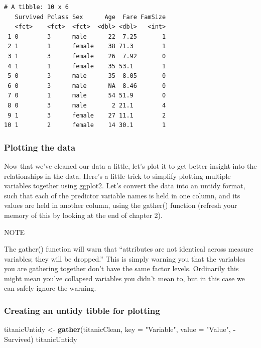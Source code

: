 \documentclass[
]{article}
\newenvironment{Shaded}{\begin{snugshade}}{\end{snugshade}}
\newcommand{\AttributeTok}[1]{\textcolor[rgb]{0.13,0.29,0.53}{#1}}
\newcommand{\FunctionTok}[1]{\textcolor[rgb]{0.13,0.29,0.53}{\textbf{#1}}}
\newcommand{\NormalTok}[1]{#1}
\newcommand{\OtherTok}[1]{\textcolor[rgb]{0.56,0.35,0.01}{#1}}
\newcommand{\SpecialCharTok}[1]{\textcolor[rgb]{0.81,0.36,0.00}{\textbf{#1}}}
\newcommand{\StringTok}[1]{\textcolor[rgb]{0.31,0.60,0.02}{#1}}
\begin{document}
\begin{verbatim}
# A tibble: 10 x 6
   Survived Pclass Sex      Age  Fare FamSize
   <fct>    <fct>  <fct>  <dbl> <dbl>   <int>
 1 0        3      male      22  7.25       1
 2 1        1      female    38 71.3        1
 3 1        3      female    26  7.92       0
 4 1        1      female    35 53.1        1
 5 0        3      male      35  8.05       0
 6 0        3      male      NA  8.46       0
 7 0        1      male      54 51.9        0
 8 0        3      male       2 21.1        4
 9 1        3      female    27 11.1        2
10 1        2      female    14 30.1        1
\end{verbatim}

\subsubsection{Plotting the data}\label{plotting-the-data}

Now that we've cleaned our data a little, let's plot it to get better
insight into the relationships in the data. Here's a little trick to
simplify plotting multiple variables together using ggplot2. Let's
convert the data into an untidy format, such that each of the predictor
variable names is held in one column, and its values are held in another
column, using the gather() function (refresh your memory of this by
looking at the end of chapter 2).

NOTE

The gather() function will warn that ``attributes are not identical
across measure variables; they will be dropped.'' This is simply warning
you that the variables you are gathering together don't have the same
factor levels. Ordinarily this might mean you've collapsed variables you
didn't mean to, but in this case we can safely ignore the warning.

\subsubsection{Creating an untidy tibble for
plotting}\label{creating-an-untidy-tibble-for-plotting}

\begin{Shaded}
\begin{Highlighting}[]
\NormalTok{titanicUntidy }\OtherTok{\textless{}{-}} \FunctionTok{gather}\NormalTok{(titanicClean, }\AttributeTok{key =} \StringTok{"Variable"}\NormalTok{, }\AttributeTok{value =} \StringTok{"Value"}\NormalTok{,}
                        \SpecialCharTok{{-}}\NormalTok{Survived)}
\NormalTok{titanicUntidy}
\end{Highlighting}
\end{Shaded}
\end{document}
